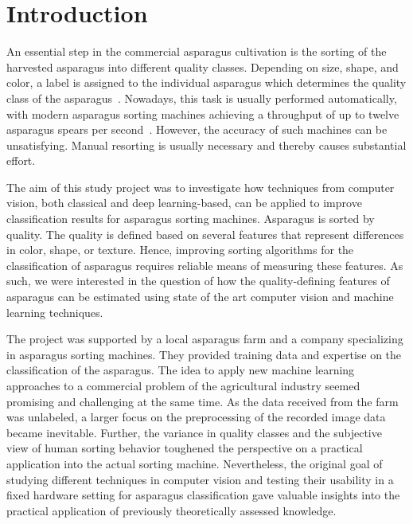 \section{Introduction}
\label{ch:Introduction}

An essential step in the commercial asparagus cultivation is the sorting of the harvested asparagus into different quality classes. Depending on size, shape, and color, a label is assigned to the individual asparagus which determines the quality class of the asparagus~\citep{unspargelnorm}. Nowadays, this task is usually performed automatically, with modern asparagus sorting machines achieving a throughput of up to twelve asparagus spears per second~\citep{ting2015zeitalter}. However, the accuracy of such machines can be unsatisfying. Manual resorting is usually necessary and thereby causes substantial effort.

\bigskip
The aim of this study project was to investigate how techniques from computer vision, both classical and deep learning-based, can be applied to improve classification results for asparagus sorting machines. Asparagus is sorted by quality. The quality is defined based on several features that represent differences in color, shape, or texture. Hence, improving sorting algorithms for the classification of asparagus requires reliable means of measuring these features. As such, we were interested in the question of how the quality-defining features of asparagus can be estimated using state of the art computer vision and machine learning techniques.

The project was supported by a local asparagus farm and a company specializing in asparagus sorting machines. They provided training data and expertise on the classification of the asparagus. The idea to apply new machine learning approaches to a commercial problem of the agricultural industry seemed promising and challenging at the same time. As the data received from the farm was unlabeled, a larger focus on the preprocessing of the recorded image data became inevitable. Further, the variance in quality classes and the subjective view of human sorting behavior toughened the perspective on a practical application into the actual sorting machine. Nevertheless, the original goal of studying different techniques in computer vision and testing their usability in a fixed hardware setting for asparagus classification gave valuable insights into the practical application of previously theoretically assessed knowledge.

